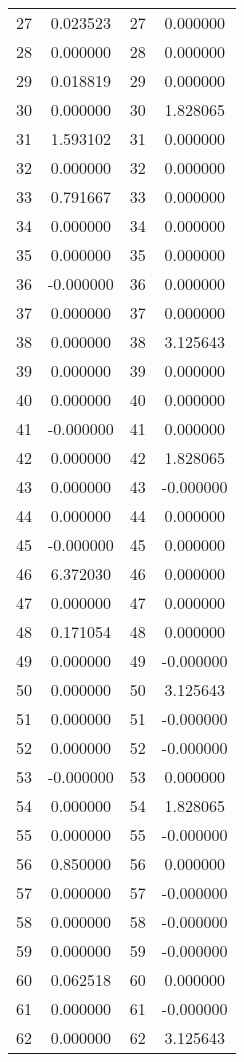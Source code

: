 \documentclass[12pt]{article}
\begin{document}
\begin{longtable}{@{}cccc@{}}
27 & 0.023523 & 27 & 0.000000 \\
28 & 0.000000 & 28 & 0.000000 \\
29 & 0.018819 & 29 & 0.000000 \\
30 & 0.000000 & 30 & 1.828065 \\
31 & 1.593102 & 31 & 0.000000 \\
32 & 0.000000 & 32 & 0.000000 \\
33 & 0.791667 & 33 & 0.000000 \\
34 & 0.000000 & 34 & 0.000000 \\
35 & 0.000000 & 35 & 0.000000 \\
36 & -0.000000 & 36 & 0.000000 \\
37 & 0.000000 & 37 & 0.000000 \\
38 & 0.000000 & 38 & 3.125643 \\
39 & 0.000000 & 39 & 0.000000 \\
40 & 0.000000 & 40 & 0.000000 \\
41 & -0.000000 & 41 & 0.000000 \\
42 & 0.000000 & 42 & 1.828065 \\
43 & 0.000000 & 43 & -0.000000 \\
44 & 0.000000 & 44 & 0.000000 \\
45 & -0.000000 & 45 & 0.000000 \\
46 & 6.372030 & 46 & 0.000000 \\
47 & 0.000000 & 47 & 0.000000 \\
48 & 0.171054 & 48 & 0.000000 \\
49 & 0.000000 & 49 & -0.000000 \\
50 & 0.000000 & 50 & 3.125643 \\
51 & 0.000000 & 51 & -0.000000 \\
52 & 0.000000 & 52 & -0.000000 \\
53 & -0.000000 & 53 & 0.000000 \\
54 & 0.000000 & 54 & 1.828065 \\
55 & 0.000000 & 55 & -0.000000 \\
56 & 0.850000 & 56 & 0.000000 \\
57 & 0.000000 & 57 & -0.000000 \\
58 & 0.000000 & 58 & -0.000000 \\
59 & 0.000000 & 59 & -0.000000 \\
60 & 0.062518 & 60 & 0.000000 \\
61 & 0.000000 & 61 & -0.000000 \\
62 & 0.000000 & 62 & 3.125643 \\

\end{longtable}
\end{document}
